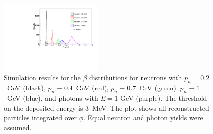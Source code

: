 \begin{figure}[htb]  
\begin{center}
\includegraphics[width=0.45\textwidth]{Figure/Figure42.pdf}
\caption {Simulation results for the $\beta$ distributions for neutrons with $p_n=0.2$~GeV (black), $p_n=0.4$~GeV (red), $p_n=0.7$~GeV (green), $p_n=1$~GeV (blue), and photons with $E=1$ GeV (purple). The threshold on the deposited energy is 3~MeV. The plot shows all reconstructed particles integrated over $\phi$. Equal neutron and photon yields were assumed.}
\label{beta_n_g}
\end{center}
\end{figure}

